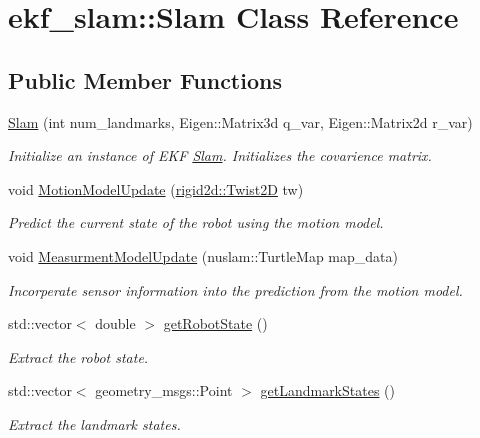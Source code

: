 \hypertarget{classekf__slam_1_1Slam}{}\section{ekf\+\_\+slam\+:\+:Slam Class Reference}
\label{classekf__slam_1_1Slam}
\subsection*{Public Member Functions}
\begin{DoxyCompactItemize}
\item 
\hyperlink{classekf__slam_1_1Slam_abc573b570700f3dfb0ff1e80c0263255}{Slam} (int num\+\_\+landmarks, Eigen\+::\+Matrix3d q\+\_\+var, Eigen\+::\+Matrix2d r\+\_\+var)
\begin{DoxyCompactList}\small\item\em Initialize an instance of E\+KF \hyperlink{classekf__slam_1_1Slam}{Slam}. Initializes the covarience matrix. \end{DoxyCompactList}\item 
void \hyperlink{classekf__slam_1_1Slam_ab26e0c13cbaaa3bce75be953f8c3b39d}{Motion\+Model\+Update} (\hyperlink{structrigid2d_1_1Twist2D}{rigid2d\+::\+Twist2D} tw)
\begin{DoxyCompactList}\small\item\em Predict the current state of the robot using the motion model. \end{DoxyCompactList}\item 
void \hyperlink{classekf__slam_1_1Slam_ae95105bbeeea067f5dc09e44e594dd3e}{Measurment\+Model\+Update} (nuslam\+::\+Turtle\+Map map\+\_\+data)
\begin{DoxyCompactList}\small\item\em Incorperate sensor information into the prediction from the motion model. \end{DoxyCompactList}\item 
std\+::vector$<$ double $>$ \hyperlink{classekf__slam_1_1Slam_a8c218402ba9d30177c6740d001430cac}{get\+Robot\+State} ()
\begin{DoxyCompactList}\small\item\em Extract the robot state. \end{DoxyCompactList}\item 
std\+::vector$<$ geometry\+\_\+msgs\+::\+Point $>$ \hyperlink{classekf__slam_1_1Slam_a66a7be45bb77f0c44717385908443832}{get\+Landmark\+States} ()
\begin{DoxyCompactList}\small\item\em Extract the landmark states. \end{DoxyCompactList}\end{DoxyCompactItemize}


